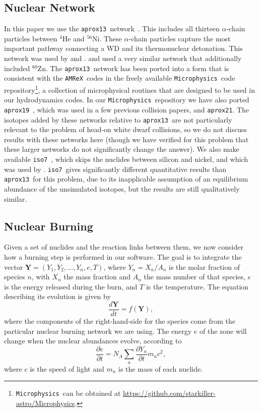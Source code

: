 \documentclass[twocolumn,numberedappendix]{../aastex6}
\newcommand{\amrex}{\texttt{AMReX}}
\newcommand{\microphysics}{\texttt{Microphysics}}
\newcommand{\isoseven}{\texttt{iso7}}
\newcommand{\aproxthirteen}{\texttt{aprox13}}
\newcommand{\aproxnineteen}{\texttt{aprox19}}
\newcommand{\aproxtwentyone}{\texttt{aprox21}}
\begin{document}
\subsection{Nuclear Network}
\label{sec:network}

In this paper we use the \aproxthirteen\ network\ \citep{timmes:1999,timmes:2000}.
This includes all thirteen $\alpha$-chain particles between ${}^4$He and ${}^{56}$Ni.
These $\alpha$-chain particles capture the most important pathway connecting a WD
and its thermonuclear detonation. This network was used by \citet{hawley:2012}
and \citet{raskin:2010}. \citet{loren-aguilar:2010} and \citet{garcia-senz:2013} used a
very similar network that additionally included ${}^{60}$Zn. The \aproxthirteen\ network has been
ported into a form that is consistent with the \amrex\ codes in the freely available
\microphysics\ code repository\footnote{\microphysics\ can be obtained at
\url{https://github.com/starkiller-astro/Microphysics}.},
a collection of microphysical routines that are designed to be used in our
hydrodynamics codes. In our \microphysics\ repository we have also ported \aproxnineteen\
\citep{timmes:1999}, which was used in a few previous collision papers, and \aproxtwentyone.
The isotopes added by these networks relative to \aproxthirteen\ are not particularly relevant
to the problem of head-on white dwarf collisions, so we do not discuss results with these networks
here (though we have verified for this problem that these larger networks do not significantly change
the answer). We also make available \isoseven\ \citep{timmes:2000}, which skips the nuclides between
silicon and nickel, and which was used by \citet{rosswog:2009}. \isoseven\ gives significantly different
quantitative results than \aproxthirteen\ for this problem, due to its inapplicable assumption of
an equilibrium abundance of the unsimulated isotopes, but the results are still qualitatively similar.

\subsection{Nuclear Burning}
\label{sec:burner}

Given a set of nuclides and the reaction links between them, we now consider
how a burning step is performed in our software. The goal is to integrate the
vector ${\bm{Y}} = (Y_1, Y_2, \ldots, Y_n, e, T)$, where $Y_{n} = X_{n} / A_{n}$
is the molar fraction of species $n$, with $X_n$ the mass fraction and $A_n$ the
mass number of that species, $e$ is the energy released during the burn, and
$T$ is the temperature. The equation describing its evolution is given by
\begin{equation}
  \frac{d\bm{Y}}{dt} = f(\mathbf{Y}),
\end{equation}
where the components of the right-hand-side for the species come from the particular
nuclear burning network we are using. The energy $e$ of the zone
will change when the nuclear abundances evolve, according to
\begin{equation}
  \frac{\partial e}{\partial t} = N_A \sum_{n} \frac{\partial Y_{n}}{\partial t} m_{n} c^2,
\end{equation}
where $c$ is the speed of light and $m_n$ is the mass of each nuclide.
\end{document}
